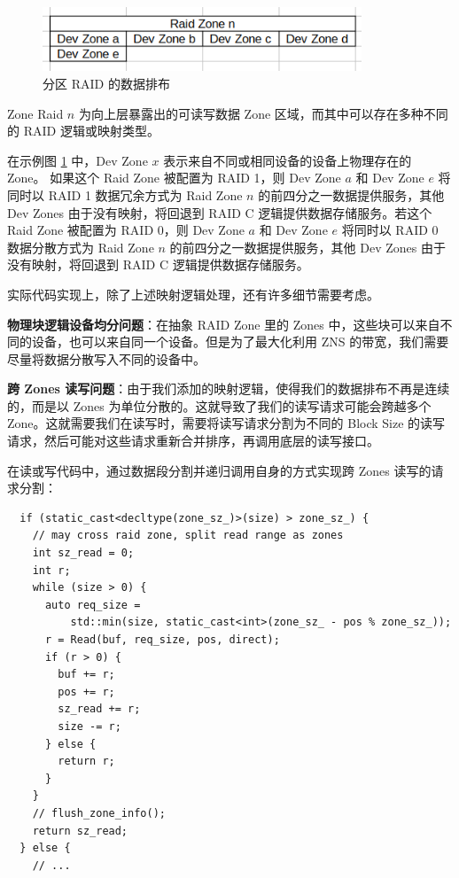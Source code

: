 \begin{figure}[htbp]
  \centering
  \includegraphics[width=0.85\textwidth]{fig/raid-a}
  \caption{ 分区 RAID 的数据排布 }
  \label{raid-a}
\end{figure}

Zone Raid $n$ 为向上层暴露出的可读写数据 Zone 区域，而其中可以存在多种不同的 RAID 逻辑或映射类型。

在示例图 \ref{raid-a} 中，Dev Zone $x$ 表示来自不同或相同设备的设备上物理存在的 Zone。
如果这个 Raid Zone 被配置为 RAID 1，则 Dev Zone $a$ 和 Dev Zone $e$ 将同时以 RAID 1 数据冗余方式为 Raid Zone $n$ 的前四分之一数据提供服务，其他 Dev Zones 由于没有映射，将回退到 RAID C 逻辑提供数据存储服务。若这个 Raid Zone 被配置为 RAID 0，则 Dev Zone $a$ 和 Dev Zone $e$ 将同时以 RAID 0 数据分散方式为 Raid Zone $n$ 的前四分之一数据提供服务，其他 Dev Zones 由于没有映射，将回退到 RAID C 逻辑提供数据存储服务。

实际代码实现上，除了上述映射逻辑处理，还有许多细节需要考虑。

\textbf{物理块逻辑设备均分问题}：在抽象 RAID Zone 里的 Zones 中，这些块可以来自不同的设备，也可以来自同一个设备。但是为了最大化利用 ZNS 的带宽，我们需要尽量将数据分散写入不同的设备中。

\textbf{跨 Zones 读写问题}：由于我们添加的映射逻辑，使得我们的数据排布不再是连续的，而是以 Zones 为单位分散的。这就导致了我们的读写请求可能会跨越多个 Zone。这就需要我们在读写时，需要将读写请求分割为不同的 Block Size 的读写请求，然后可能对这些请求重新合并排序，再调用底层的读写接口。

在读或写代码中，通过数据段分割并递归调用自身的方式实现跨 Zones 读写的请求分割：

\begin{lstlisting}
  if (static_cast<decltype(zone_sz_)>(size) > zone_sz_) {
    // may cross raid zone, split read range as zones
    int sz_read = 0;
    int r;
    while (size > 0) {
      auto req_size =
          std::min(size, static_cast<int>(zone_sz_ - pos % zone_sz_));
      r = Read(buf, req_size, pos, direct);
      if (r > 0) {
        buf += r;
        pos += r;
        sz_read += r;
        size -= r;
      } else {
        return r;
      }
    }
    // flush_zone_info();
    return sz_read;
  } else {
    // ...
\end{lstlisting}

